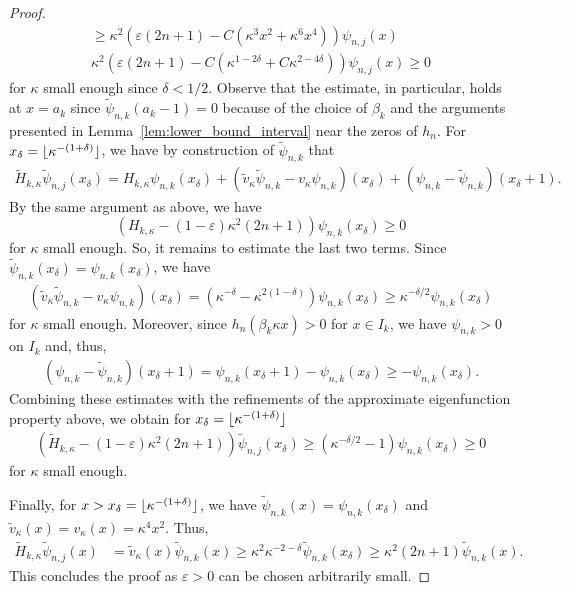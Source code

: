 \documentclass[12pt, reqno]{amsart}
\theoremstyle{definition}
\numberwithin{equation}{section}
\DeclarePairedDelimiter\floor{\lfloor}{\rfloor}
\begin{document}
\begin{proof}
\begin{multline*}
 \ge  {\kappa}^2  \left(\varepsilon  (2n+1)  -C( {\kappa}^3x^2 + \kappa^6 x^4)\right)  \psi_{n,j}(x)\\
{\kappa}^2  \left(\varepsilon  (2n+1)  -C ({\kappa}^{1-2\delta} + C \kappa^{2-4\delta})\right)  \psi_{n,j}(x) \ge 0
 \end{multline*}  
 for $\kappa$ small enough since $\delta<1/2$. Observe that the  estimate, in particular, holds at $x=a_k$ since $\tilde\psi_{n,k}(a_k-1)=0$ because of the choice of $\beta_k$ and the arguments presented in Lemma~\ref{lem:lower_bound_interval} near the zeros of $h_n$. 
 For $x_\delta=\floor{\kappa^{-(1+\delta)}}$, we have by construction of $\tilde \psi_{n,k}$ that
 \begin{multline*}
    \tilde H_{k,\kappa} \tilde\psi_{n,j}(x_\delta) =  H_{k,\kappa} \psi_{n,k}(x_\delta)+(\tilde v_\kappa\tilde\psi_{n,k}-v_\kappa\psi_{n,k})(x_\delta)+ (\psi_{n,k}-\tilde\psi_{n,k})(x_\delta+1).
 \end{multline*}
 By the same argument as above, we have
 $$ (H_{k,\kappa} -(1-\varepsilon)\kappa^2(2n+1) ) \psi_{n,k}(x_\delta)\ge0$$
 for $\kappa$ small enough. So, it remains to estimate the last two terms.
 Since $\tilde\psi_{n,k}(x_\delta)=\psi_{n,k}(x_\delta)$, we have
 \begin{align*}
    (\tilde v_\kappa\tilde\psi_{n,k}-v_\kappa\psi_{n,k})(x_\delta)
    =(\kappa^{-\delta}-\kappa^{2(1-\delta)}) \psi_{n,k}(x_\delta)\ge \kappa^{-\delta/2} \psi_{n,k}(x_\delta)
 \end{align*}
 for $\kappa$ small enough. Moreover, since $h_n(\beta_k\kappa x)>0$ for $x\in I_k$, we have $\psi_{n,k}>0$ on $I_k$ and, thus,
\begin{align*}
   (\psi_{n,k}-\tilde\psi_{n,k})(x_\delta+1) =\psi_{n,k}(x_\delta+1)-\psi_{n,k}(x_\delta)\ge -\psi_{n,k}(x_\delta).
 \end{align*}
Combining these estimates with the refinements of the approximate eigenfunction property above, we obtain for $x_\delta=\floor{\kappa^{-(1+\delta)}}$
 \begin{align*}  
 ( \tilde H_{k,\kappa} -(1-\varepsilon)\kappa^2(2n+1) ) \tilde\psi_{n,j}(x_\delta)\ge \left(\kappa^{-\delta/2} -1\right)\psi_{n,k}(x_\delta) \ge 0
 \end{align*}  
 for $\kappa$ small enough. 
 
 Finally, for $x>x_\delta=\floor{\kappa^{-(1+\delta)}}$, we have $\tilde\psi_{n,k}(x)=\psi_{n,k}(x_\delta)$ and $\tilde v_\kappa(x)=v_\kappa(x)=\kappa^4 x^2$. Thus, 
 \begin{align*}  
    \tilde H_{k,\kappa} \tilde\psi_{n,j}(x) &= \tilde v_\kappa(x)\tilde\psi_{n,k}(x)
    \ge \kappa^2 \kappa^{-2-\delta} \tilde\psi_{n,k}(x_\delta)\ge \kappa^2(2n+1) \tilde\psi_{n,k}(x).
 \end{align*}    
 This concludes the proof as $\varepsilon>0$ can be chosen arbitrarily small.
\end{proof}
\end{document}
